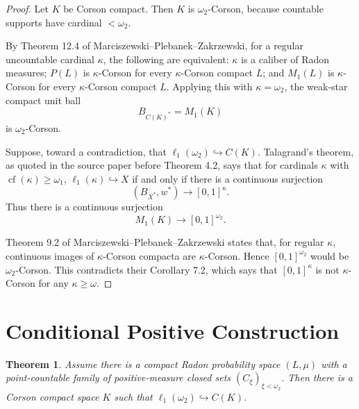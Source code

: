 \documentclass[11pt]{article}
\newtheorem{theorem}{Theorem}
\newcommand{\wstar}{w^\ast}
\newcommand{\ellone}{\ell_1}
\newcommand{\omegatwo}{\omega_2}
\newcommand{\embed}{\hookrightarrow}
\begin{document}
\begin{proof}
Let \(K\) be Corson compact.  Then \(K\) is \(\omegatwo\)-Corson, because
countable supports have cardinal \(<\omegatwo\).

By Theorem 12.4 of Marciszewski--Plebanek--Zakrzewski, for a regular
uncountable cardinal \(\kappa\), the following are equivalent: \(\kappa\) is a
caliber of Radon measures; \(P(L)\) is \(\kappa\)-Corson for every
\(\kappa\)-Corson compact \(L\); and \(M_1(L)\) is \(\kappa\)-Corson for
every \(\kappa\)-Corson compact \(L\).  Applying this with
\(\kappa=\omegatwo\), the weak-star compact unit ball
\[
B_{C(K)^*}=M_1(K)
\]
is \(\omegatwo\)-Corson.

Suppose, toward a contradiction, that \(\ellone(\omegatwo)\embed C(K)\).
Talagrand's theorem, as quoted in the source paper before Theorem 4.2, says
that for cardinals \(\kappa\) with \(\operatorname{cf}(\kappa)\ge\omega_1\),
\(\ellone(\kappa)\embed X\) if and only if there is a continuous surjection
\[
(B_{X^*},\wstar)\longrightarrow [0,1]^\kappa .
\]
Thus there is a continuous surjection
\[
M_1(K)\longrightarrow [0,1]^{\omegatwo}.
\]

Theorem 9.2 of Marciszewski--Plebanek--Zakrzewski states that, for regular
\(\kappa\), continuous images of \(\kappa\)-Corson compacta are
\(\kappa\)-Corson.  Hence \([0,1]^{\omegatwo}\) would be
\(\omegatwo\)-Corson.  This contradicts their Corollary 7.2, which says that
\([0,1]^\kappa\) is not \(\kappa\)-Corson for any \(\kappa\ge\omega\).
\end{proof}

\section*{Conditional Positive Construction}

\begin{theorem}\label{thm:positive}
Assume there is a compact Radon probability space \((L,\mu)\) with a
point-countable family of positive-measure closed sets
\((C_\xi)_{\xi<\omegatwo}\).  Then there is a Corson compact space \(K\) such
that \(\ellone(\omegatwo)\embed C(K)\).
\end{theorem}
\end{document}
